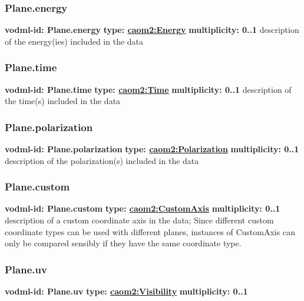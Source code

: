     \subsubsection{Plane.energy}
      \textbf{vodml-id: Plane.energy} \newline
      \textbf{type: \hyperref[sect:Energy]{caom2:Energy}} \newline
      \textbf{multiplicity: 0..1} \newline
      description of the energy(ies) included in the data

    \subsubsection{Plane.time}
      \textbf{vodml-id: Plane.time} \newline
      \textbf{type: \hyperref[sect:Time]{caom2:Time}} \newline
      \textbf{multiplicity: 0..1} \newline
      description of the time(s) included in the data

    \subsubsection{Plane.polarization}
      \textbf{vodml-id: Plane.polarization} \newline
      \textbf{type: \hyperref[sect:Polarization]{caom2:Polarization}} \newline
      \textbf{multiplicity: 0..1} \newline
      description of the polarization(s) included in the data

    \subsubsection{Plane.custom}
      \textbf{vodml-id: Plane.custom} \newline
      \textbf{type: \hyperref[sect:CustomAxis]{caom2:CustomAxis}} \newline
      \textbf{multiplicity: 0..1} \newline
      description of a custom coordinate axis in the data; Since different custom coordinate types can be used with different planes, instances of CustomAxis can only be compared sensibly if they have the same coordinate type.

    \subsubsection{Plane.uv}
      \textbf{vodml-id: Plane.uv} \newline
      \textbf{type: \hyperref[sect:Visibility]{caom2:Visibility}} \newline
      \textbf{multiplicity: 0..1} 

